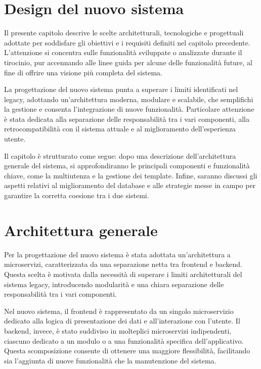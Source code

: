 \section{Design del nuovo sistema}

Il presente capitolo descrive le scelte architetturali, tecnologiche e progettuali adottate per soddisfare gli obiettivi e i requisiti definiti nel capitolo precedente. L'attenzione si concentra sulle funzionalità sviluppate o analizzate durante il tirocinio, pur accennando alle linee guida per alcune delle funzionalità future, al fine di offrire una visione più completa del sistema.

La progettazione del nuovo sistema punta a superare i limiti identificati nel legacy, adottando un'architettura moderna, modulare e scalabile, che semplifichi la gestione e consenta l'integrazione di nuove funzionalità. Particolare attenzione è stata dedicata alla separazione delle responsabilità tra i vari componenti, alla retrocompatibilità con il sistema attuale e al miglioramento dell'esperienza utente.

Il capitolo è strutturato come segue: dopo una descrizione dell’architettura generale del sistema, si approfondiranno le principali componenti e funzionalità chiave, come la multiutenza e la gestione dei template. Infine, saranno discussi gli aspetti relativi al miglioramento del database e alle strategie messe in campo per garantire la corretta coesione tra i due sistemi.

\section{Architettura generale}

Per la progettazione del nuovo sistema è stata adottata un'architettura a microservizi, caratterizzata da una separazione netta tra frontend e backend. Questa scelta è motivata dalla necessità di superare i limiti architetturali del sistema legacy, introducendo modularità e una chiara separazione delle responsabilità tra i vari componenti.

Nel nuovo sistema, il frontend è rappresentato da un singolo microservizio dedicato alla logica di presentazione dei dati e all'interazione con l'utente. Il backend, invece, è stato suddiviso in molteplici microservizi indipendenti, ciascuno dedicato a un modulo o a una funzionalità specifica dell'applicativo. Questa scomposizione consente di ottenere una maggiore flessibilità, facilitando sia l'aggiunta di nuove funzionalità che la manutenzione del sistema.


